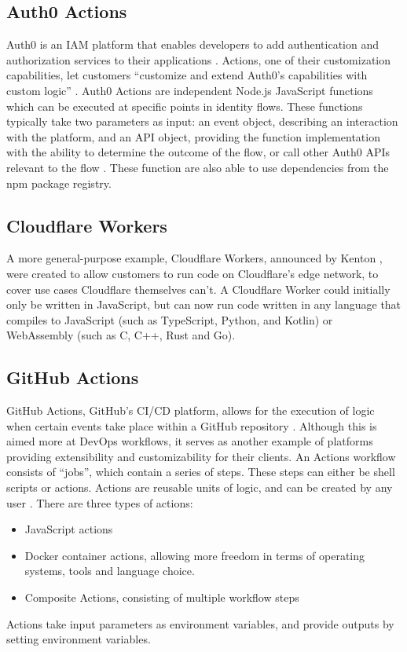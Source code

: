 \subsection{Auth0 Actions}
Auth0 is an IAM platform that enables developers to add authentication and authorization services to their applications \autocite{Auth0Overview}. Actions, one of their customization capabilities, let customers ``customize and extend Auth0's capabilities with custom logic'' \autocite{Auth0Actions}. Auth0 Actions are independent Node.js JavaScript functions which can be executed at specific points in identity flows. These functions typically take two parameters as input: an event object, describing an interaction with the platform, and an API object, providing the function implementation with the ability to determine the outcome of the flow, or call other Auth0 APIs relevant to the flow \autocite{Auth0Triggers}. These function are also able to use dependencies from the npm package registry.



\subsection{Cloudflare Workers}
A more general-purpose example, Cloudflare Workers, announced by Kenton \textcite{Varda2017}, were created to allow customers to run code on Cloudflare's edge network, to cover use cases Cloudflare themselves can't. A Cloudflare Worker could initially only be written in JavaScript, but can now run code written in any language that compiles to JavaScript (such as TypeScript, Python, and Kotlin) or WebAssembly (such as C, C++, Rust and Go). \autocite{Varda2018, Koeninger2020}

\subsection{GitHub Actions}
GitHub Actions, GitHub's CI/CD platform, allows for the execution of logic when certain events take place within a GitHub repository \autocite{GitHubActions}. Although this is aimed more at DevOps workflows, it serves as another example of platforms providing extensibility and customizability for their clients. An Actions workflow consists of ``jobs'', which contain a series of steps. These steps can either be shell scripts or actions. Actions are reusable units of logic, and can be created by any user \autocite{GitHubCustomActions}. There are three types of actions:
\begin{itemize}
    \item{JavaScript actions} 
    \item{Docker container actions, allowing more freedom in terms of operating systems, tools and language choice.}
    \item{Composite Actions, consisting of multiple workflow steps}
\end{itemize}
Actions take input parameters as environment variables, and provide outputs by setting environment variables. 
